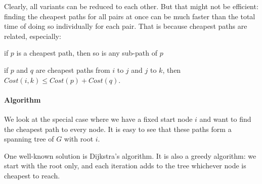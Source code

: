 Clearly, all variants can be reduced to each other.
But that might not be efficient: finding the cheapest paths for all pairs at once can be much faster than the total time of doing so individually for each pair.
That is because cheapest paths are related, especially:
\begin{compactitem}
  \item if $p$ is a cheapest path, then so is any sub-path of $p$
  \item if $p$ and $q$ are cheapest paths from $i$ to $j$ and $j$ to $k$, then $Cost(i,k)\leq Cost(p)+Cost(q)$.
\end{compactitem}

\paragraph{Algorithm}
We look at the special case where we have a fixed start node $i$ and want to find the cheapest path to every node.
It is easy to see that these paths form a spanning tree of $G$ with root $i$.

One well-known solution is Dijkstra's algorithm.
It is also a greedy algorithm: we start with the root only, and each iteration adds to the tree whichever node is cheapest to reach.

\begin{acode}
\\
\end{acode}


